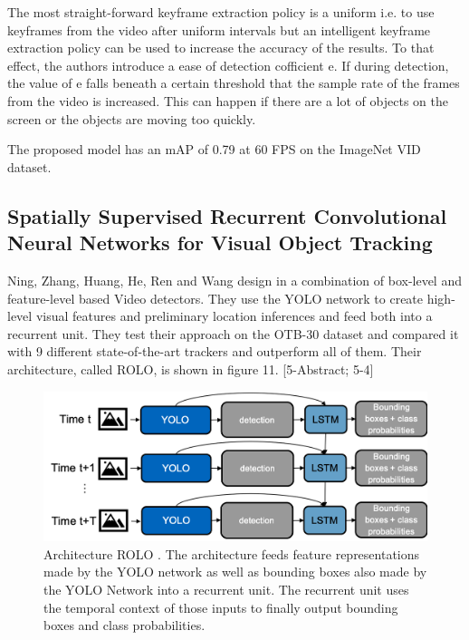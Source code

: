 \documentclass[conference]{IEEEtran}
\begin{document}
The most straight-forward keyframe extraction policy is a uniform i.e. to use keyframes from the video after uniform intervals but an intelligent keyframe extraction policy can be used to increase the accuracy of the results. To that effect, the authors introduce a ease of detection cofficient e. If during detection, the value of e falls beneath a certain threshold that the sample rate of the frames from the video is increased. This can happen if there are a lot of objects on the screen or the objects are moving too quickly. \newline

The proposed model has an mAP of 0.79 at 60 FPS on the ImageNet VID dataset. \newline

\subsection{Spatially Supervised Recurrent Convolutional Neural Networks for Visual Object Tracking \cite{b5}}
Ning, Zhang, Huang, He, Ren and Wang design in \cite{b5} a combination of box-level and feature-level based Video detectors. They use the YOLO \cite{b26} network to create high-level visual features and preliminary location inferences and feed both into a recurrent unit. They test their approach on the OTB-30 dataset \cite{b28} and compared it with 9 different state-of-the-art trackers and outperform all of them. Their architecture, called ROLO, is shown in figure 11. [5-Abstract; 5-4] 

\begin{figure} [h]
\includegraphics[width=\columnwidth]{ROLO}
\caption{Architecture ROLO \cite{b5}. The architecture feeds feature representations made by the YOLO network as well as bounding boxes also made by the YOLO Network into a recurrent unit. The recurrent unit uses the temporal context of those inputs to finally output bounding boxes and class probabilities.}
\end{figure}
\end{document}
